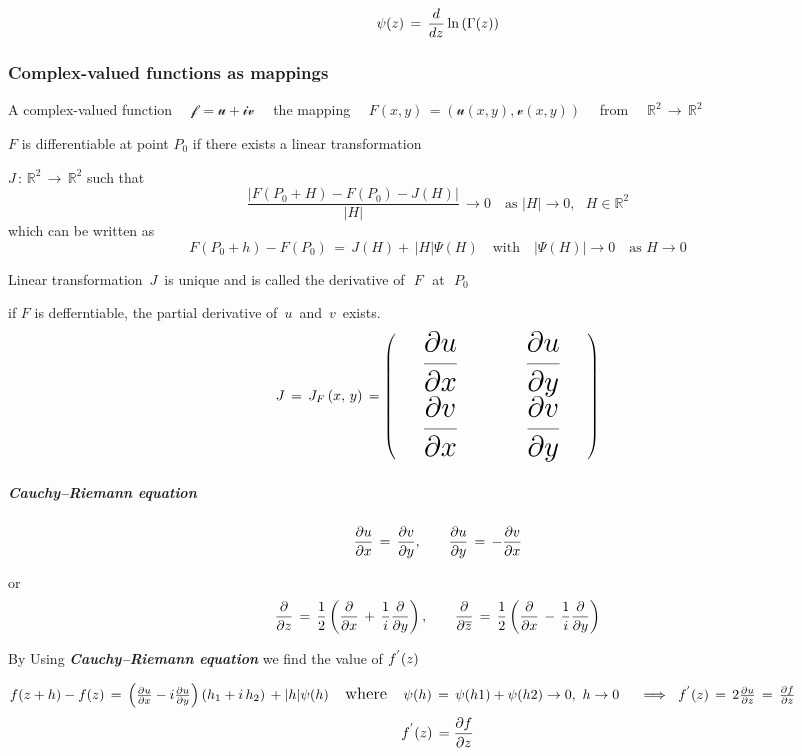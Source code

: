 \documentclass[11pt]{article}
\begin{document}
\[\Huge \psi{(z)}\,=\,\dfrac{d}{dz}\ln \left(\Gamma{(z)}\right) \]

    \subsubsection{Complex-valued functions as
mappings}\label{complex-valued-functions-as-mappings}

A complex-valued function
\(\quad\mathcal{f}\,= \mathcal{u}+\mathcal{iv}\quad\) the mapping
\(\quad F(x,y)\,=(\mathcal{u}(x,y),\mathcal{v}(x,y))\quad\) from
\(\quad\mathbb{R}^{2}\,\to\,\mathbb{R}^2\)

\(F\) is differentiable at point \(P_{0}\) if there exists a linear
transformation

\(J\,:\,\mathbb{R}^{2}\,\to\,\mathbb{R}^2\) such that
\[ \dfrac{|F(P_{0}+H)-F(P_{0})-J(H)|}{|H|}\,\to 0 \quad \text{as}\,\,|H|\to 0,\,\,\,\,H\in\mathbb{R}^{2}\]
which can be written as
\[F(P_{0}+h)-F(P_{0})\,=\,J(H)+\,|H|\Psi(H)\quad \text{with}\quad |\Psi(H)|\to 0\quad \text{as}\,\,H\to 0\]

Linear transformation \(\,J\,\) is unique and is called the derivative
of \(\,\,F\,\,\) at \(\,\,P_{0}\)

if \(F\) is defferntiable, the partial derivative of \(\,u\,\) and
\(\,v\,\) exists.
\[\huge J\,=\,J_{F}\left(x,\,y\right)\,=\begin{pmatrix}\quad \dfrac{\partial{u}}{\partial{x}}\quad &  \dfrac{\partial{u}}{\partial{y}} \\  \quad\dfrac{\partial{v}}{\partial{x}}\quad &  \quad\dfrac{\partial{v}}{\partial{y}}\quad \end{pmatrix}\]

\subparagraph{Cauchy--Riemann equation}\label{cauchyriemann-equation}

\[\huge \frac{\partial u}{\partial x}\,=\,\frac{\partial v}{\partial y},\quad \frac{\partial u}{\partial y}\,=\,-\frac{\partial v}{\partial x}\]

or
\[\huge \frac{\partial}{\partial z}\,=\,\frac{1}{2}\left(\frac{\partial}{\partial x}\,+\,\frac{1}{i}\frac{\partial}{\partial y}\right),\quad \frac{\partial}{\partial \overline{z}}\,=\,\frac{1}{2}\left(\frac{\partial}{\partial x}\,-\,\frac{1}{i}\frac{\partial}{\partial y}\right) \]

By Using \textbf{\emph{Cauchy--Riemann equation}} we find the value of
\(\large{f^{'}}(z)\)

\(\large f(z+h)-f(z)\,=\,\left(\frac{\partial u}{\partial x} - i\frac{\partial u}{\partial y}\right)\left(h_{1}+i\,h_{2}\right)\,+|h|\psi{(h)}\quad\text{where}\quad\psi(h)\,=\,\psi(h1)+\psi(h2)\to 0,\,\,h\to 0 \quad \implies
\,\,f^{'}(z)\,=\,2\frac{\partial u}{\partial z}\,=\,\frac{\partial f}{\partial z}\)
\[\huge f^{'}(z)\,=\frac{\partial f}{\partial z}\]
\end{document}
